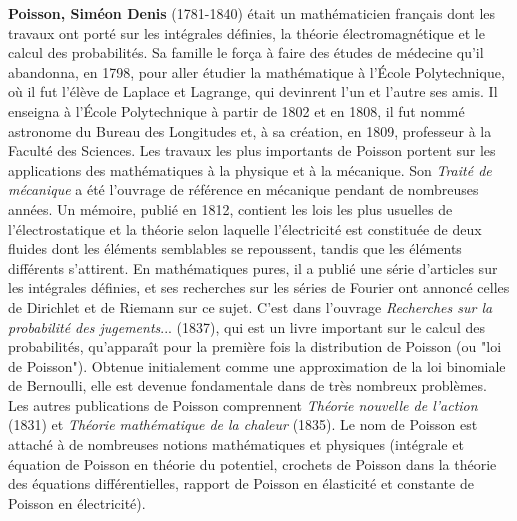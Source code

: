 \textbf{Poisson, Siméon Denis} (1781-1840) était un mathématicien français dont les travaux ont porté sur les intégrales définies, la théorie électromagnétique et le calcul des probabilités. Sa famille le força à faire des études de médecine qu'il abandonna, en 1798, pour aller étudier la mathématique à l'École Polytechnique, où il fut l'élève de Laplace et  Lagrange, qui devinrent l'un et l'autre ses amis. Il enseigna à l'École Polytechnique à partir de 1802 et en 1808, il fut nommé astronome du Bureau des Longitudes et, à sa création, en 1809, professeur à la Faculté des Sciences. Les travaux les plus importants de Poisson portent sur les applications des mathématiques à la physique et à la mécanique. Son \textit{Traité de mécanique} a été l'ouvrage de référence en mécanique pendant de nombreuses années. Un mémoire, publié en 1812, contient les lois les plus usuelles de l'électrostatique et la théorie selon laquelle l'électricité est constituée de deux fluides dont les éléments semblables se repoussent, tandis que les éléments différents s'attirent. En mathématiques pures, il a publié une série d'articles sur les intégrales définies, et ses recherches sur les séries de Fourier ont annoncé celles de Dirichlet et de Riemann sur ce sujet. C'est dans l'ouvrage \textit{Recherches sur la probabilité des jugements}... (1837), qui est un livre important sur le calcul des probabilités, qu'apparaît pour la première fois la distribution de Poisson (ou "loi de Poisson"). Obtenue initialement comme une approximation de la loi binomiale de Bernoulli, elle est devenue fondamentale dans de très nombreux problèmes. Les autres publications de Poisson comprennent\textit{ Théorie nouvelle de l'action} (1831) et \textit{Théorie mathématique de la chaleur} (1835). Le nom de Poisson est attaché à de nombreuses notions mathématiques et physiques (intégrale et équation de Poisson en théorie du potentiel, crochets de Poisson dans la théorie des équations différentielles, rapport de Poisson en élasticité et constante de Poisson en électricité).

